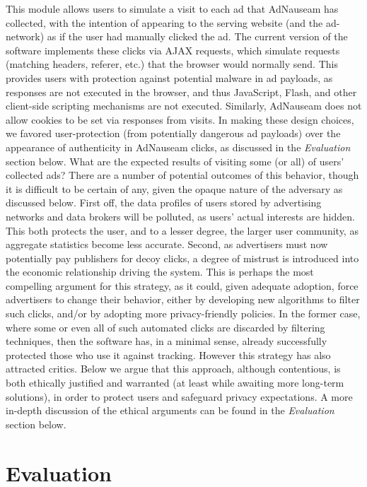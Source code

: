 \documentclass[conference]{IEEEtran}
\begin{document}
This module allows users to simulate a visit to each ad that AdNauseam has collected, with the intention of appearing to the serving website (and the ad-network) as if the user had manually clicked the ad. The current version of the software implements these clicks via AJAX requests, which simulate requests (matching headers, referer, etc.) that the browser would normally send. This provides users with protection against potential malware in ad payloads, as responses are not executed in the browser, and thus JavaScript, Flash, and other client-side scripting mechanisms are not executed. Similarly, AdNauseam does not allow cookies to be set via responses from visits. In making these design choices, we favored user-protection (from potentially dangerous ad payloads) over the appearance of authenticity in AdNauseam clicks, as discussed in the \emph{Evaluation} section below. What are the expected results of visiting some (or all) of users' collected ads? There are a number of potential outcomes of this behavior, though it is difficult to be certain of any, given the opaque nature of the adversary as discussed below. First off, the data profiles of users stored by advertising networks and data brokers will be polluted, as users' actual interests are hidden. This both protects the user, and to a lesser degree, the larger user community, as aggregate statistics become less accurate. Second, as advertisers must now potentially pay publishers for decoy clicks, a degree of mistrust is introduced into the economic relationship driving the system. This is perhaps the most compelling argument for this strategy, as it could, given adequate adoption, force advertisers to change their behavior, either by developing new algorithms to filter such clicks, and/or by adopting more privacy-friendly policies. In the former case, where some or even all of such automated clicks are discarded by filtering techniques, then the software has, in a minimal sense, already successfully protected those who use it against tracking. However this strategy has also attracted critics. Below we argue that this approach, although contentious, is both ethically justified and warranted (at least while awaiting more long-term solutions), in order to protect users and safeguard privacy expectations. A more in-depth discussion of the ethical arguments can be found in the \emph{Evaluation} section below.

\section{Evaluation}
\end{document}
